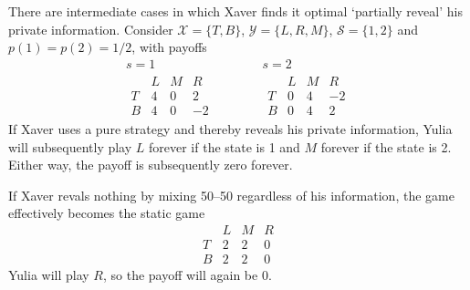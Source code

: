 \documentclass[11pt,letterpaper,reqno,oneside]{article}
\begin{document}
\begin{example}
	\label{example:AM3}
	There are intermediate cases in which Xaver finds it optimal `partially reveal' his private information. Consider $\mathcal{X}=\{T,B\}$, $\mathcal{Y}=\{L,R,M\}$, $\mathcal{S}=\{1,2\}$ and $p(1)=p(2)=1/2$, with payoffs
	\begin{equation*}
		\begin{gathered}
			s=1\\
			\begin{array}{c|ccc}
				  & L & M & R \\ \hline
				T & 4 & 0 & 2 \\
				B & 4 & 0 & -2
			\end{array}
		\end{gathered}
		\quad\quad\quad
		\begin{gathered}
			s=2\\
			\begin{array}{c|ccc}
				  & L & M & R \\ \hline
				T & 0 & 4 & -2 \\
				B & 0 & 4 & 2
			\end{array}
		\end{gathered}
	\end{equation*}
	If Xaver uses a pure strategy and thereby reveals his private information, Yulia will subsequently play $L$ forever if the state is 1 and $M$ forever if the state is 2. Either way, the payoff is subsequently zero forever.

	If Xaver revals nothing by mixing 50--50 regardless of his information, the game effectively becomes the static game
	\begin{equation*}
		\begin{array}{c|ccc}
			  & L & M & R \\ \hline
			T & 2 & 2 & 0 \\
			B & 2 & 2 & 0
		\end{array}
	\end{equation*}
	Yulia will play $R$, so the payoff will again be 0.


\end{example}
\end{document}
